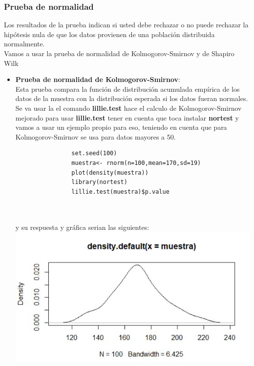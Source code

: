 \documentclass[12pt,hidelinks]{article}
\begin{document}
            \subsubsection{Prueba de normalidad}
            Los resultados de la prueba indican si usted debe rechazar o no puede rechazar la hipótesis nula de que los datos provienen de una población distribuida normalmente.
            \\ Vamos a usar la prueba de normalidad de Kolmogorov-Smirnov y de Shapiro Wilk
            \begin{itemize}
                \item \textbf{Prueba de normalidad de Kolmogorov-Smirnov}:\\
                Esta prueba compara la función de distribución acumulada empírica de los datos de la muestra con la distribución esperada si los datos fueran normales.
                Se va usar la el comando \textbf{lillie.test} hace el calculo de Kolmogorov-Smirnov mejorado para usar \textbf{lillie.test} tener en cuenta que toca instalar \textbf{nortest} y vamos a usar un ejemplo propio para eso, teniendo en cuenta que para Kolmogorov-Smirnov se usa para datos mayores a 50.
                \begin{lstlisting}
                set.seed(100)
                muestra<- rnorm(n=100,mean=170,sd=19)
                plot(density(muestra))
                library(nortest)
                lillie.test(muestra)$p.value
                
                \end{lstlisting}\\
                y su respuesta y gráfica serian las siguientes:\\
                \centering \includegraphics[scale=0.8]{ks_grafica1.jpeg}\\
                \centering
                \caption{}\\
                

\end{itemize}
\end{document}
